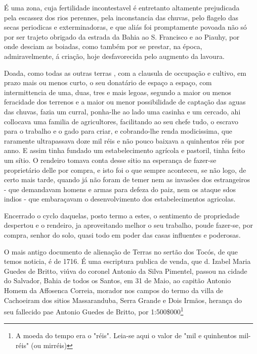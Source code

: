  
 É uma zona, cuja fertilidade incontestavel é entretanto altamente prejudicada pela escassez dos rios perennes, pela inconstancia das chuvas, pelo flagelo das secas periodicas e exterminadoras, e que aliás foi promptamente povoada não só por ser trajeto obrigado da estrada da Bahia ao S. Francisco e ao Piauhy, por onde desciam as boiadas, como também por se prestar, na época, admiravelmente, á criação, hoje desfavorecida pelo augmento da lavoura.
 
 Doada, como todas as outras terras , com a clausula de occupação e cultivo, em prazo mais ou menos curto, o seu  donatário de espaço a espaço, com intermittencia de uma, duas, tres  e mais legoas, segundo a maior ou menos feracidade  dos terrenos e a maior ou menor possibilidade de captação das aguas das chuvas, fazia um curral,  ponha-lhe ao lado uma casinha e um cercado, ahi collocava uma familia de agricultores, facilitando ao seu chefe tudo, o escravo para o trabalho e o gado para criar, e cobrando-lhe renda modicissima, que raramente ultrapassava doze  mil réis e não pouco baixava a quinhentos réis por anno. E assim tinha fundado um  estabelecimento agrícola e pastoril, tinha feito um sítio. O rendeiro tomava conta desse sitio na esperança  de fazer-se proprietário delle por compra, e isto foi o que sempre aconteceu, se não logo, de certo mais tarde, quando já não  foram de temer nem as invasões dos estrangeiros - que demandavam homens e armas para defeza do paiz, nem os ataque sdos indios - que embaraçavam o desenvolvimento dos estabelecimentos agricolas.
 
 Encerrado o cyclo daquelas, posto termo a estes, o sentimento de propriedade despertou e o rendeiro, ja aproveitando melhor o seu  trabalho, poude fazer-se, por compra, senhor do solo, quasi todo em poder das casas influentes e poderosas.
 
 O mais antigo documento de alienação de Terras no sertão dos Tocós, de que temos noticia, é de 1716. É uma escriptura  publica de venda, que d. Izabel Maria Guedes de Britto, viúva do coronel Antonio da Silva Pimentel, passou na cidade do Salvador, Bahia de todos os Santos, em 31 de Maio, ao capitão Antonio Homem da Affosenca Correia,  morador nos campos do termo  da villa de Cachoeiram dos sitios  Massaranduba, Serra  Grande e Dois Irmãos, herança do seu fallecido pae Antonio Guedes de Britto, por 1:500\$000\footnote{A moeda do tempo era o "réis". Leia-se aqui o valor de "mil e quinhentos mil-réis" (ou mirréis)}
 
